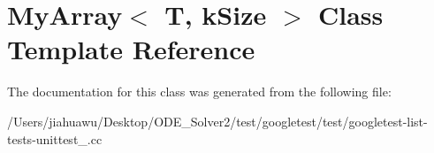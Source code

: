\hypertarget{class_my_array}{}\section{My\+Array$<$ T, k\+Size $>$ Class Template Reference}
\label{class_my_array}


The documentation for this class was generated from the following file\+:\begin{DoxyCompactItemize}
\item 
/\+Users/jiahuawu/\+Desktop/\+O\+D\+E\+\_\+\+Solver2/test/googletest/test/googletest-\/list-\/tests-\/unittest\+\_\+.\+cc\end{DoxyCompactItemize}
